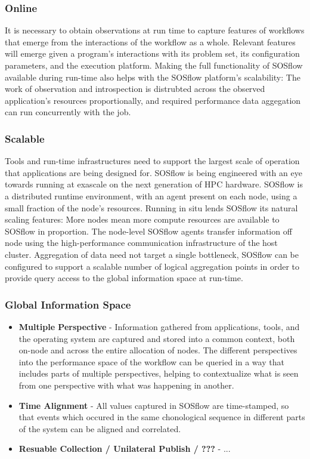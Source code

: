 \subsubsection{Online}
%
It is necessary to obtain observations at run time to capture features
of workflows that emerge from the interactions of the workflow as a
whole.
%
Relevant features will emerge given a program's interactions
with its problem set, its configuration parameters, and the execution platform.
%
Making the full functionality of SOSflow available during run-time
also helps with the SOSflow platform's scalability: The work of
observation and introspection is distrubted across the observed
application's resources proportionally, and required performance data
aggegation can run concurrently with the job.
%
\subsubsection{Scalable}
%
Tools and run-time infrastructures need to support the largest scale of
operation that applications are being designed for.
%
SOSflow is being engineered with an eye towards running at exascale
on the next generation of HPC hardware.
%
SOSflow is a distributed runtime environment, with an agent present
on each node, using a small fraction of the node's resources.
%
Running in situ lends SOSflow its natural scaling features: More nodes
mean more compute resources are available to SOSflow in proportion.
%
The node-level SOSflow agents transfer information off node using
the high-performance communication infrastructure of the host cluster.
%
Aggregation of data need not target a single bottleneck, SOSflow can
be configured to support a scalable number of logical aggregation points
in order to provide query access to the global information space at
run-time.
%
\subsubsection{Global Information Space}
     \begin{itemize}
        \item \textbf{Multiple Perspective} - Information gathered from
          applications, tools, and the operating system are captured
          and stored into a common context, both on-node and across
          the entire allocation of nodes.  The different perspectives
          into the performance space of the workflow can be queried
          in a way that includes parts of multiple perspectives,
          helping to contextualize what is seen from one perspective
          with what was happening in another.
        \item \textbf{Time Alignment} - All values captured in SOSflow
          are time-stamped, so that events which occured in the same
          chonological sequence in different parts of the system can be
          aligned and correlated.
        \item \textbf{Resuable Collection / Unilateral Publish / ???} - ...
     \end{itemize}


